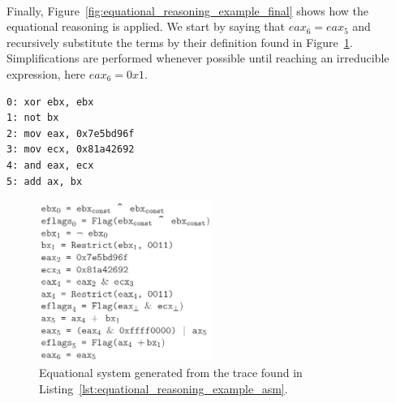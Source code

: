 \paragraph{}
Finally, Figure~\ref{fig:equational_reasoning_example_final} shows how the equational reasoning is applied. We start by saying that $eax_6 = eax_5$ and recursively substitute the terms by their definition found in Figure~\ref{fig:equational_reasoning_example_after}. Simplifications are performed whenever possible until reaching an irreducible expression, here $eax_6 = 0x1$. \\

\begin{lstlisting}[caption={Snippet of assembly code. From the PHD thesis of Kevin Coogan~\cite{coogan2011deobfuscation}.}, label={lst:equational_reasoning_example_asm}, frame=tlrb, language={[x86masm]Assembler}]
0: xor ebx, ebx
1: not bx
2: mov eax, 0x7e5bd96f
3: mov ecx, 0x81a42692
4: and eax, ecx
5: add ax, bx
\end{lstlisting}

\begin{figure}[!htb]
	\centering
	\includegraphics[width=0.5\textwidth]{equational_reasoning/equational_reasoning_example_after.png}
	\caption{Equational system generated from the trace found in Listing~\ref{lst:equational_reasoning_example_asm}.}
	\label{fig:equational_reasoning_example_after}
\end{figure}

